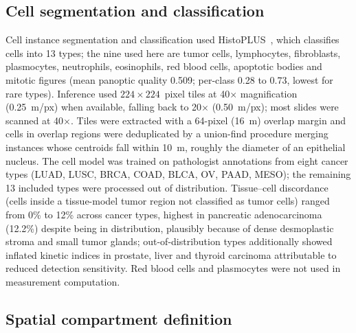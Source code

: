 \subsection{Cell segmentation and classification}
\label{sec:methods:cells}

Cell instance segmentation and classification used
HistoPLUS~\cite{adjadj2026histoplus}, which classifies cells into 13 types; the
nine used here are
tumor cells, lymphocytes, fibroblasts, plasmocytes, neutrophils, eosinophils,
red blood cells, apoptotic bodies and mitotic figures (mean panoptic quality
0.509; per-class 0.28 to 0.73, lowest for rare types). Inference used
$224 \times 224$~pixel tiles at 40$\times$ magnification (0.25~\textmu m/px) when
available, falling back to 20$\times$ (0.50~\textmu m/px); most slides were
scanned at 40$\times$. Tiles were extracted with a 64-pixel (16~\textmu m)
overlap margin and cells in overlap regions were deduplicated by a union-find
procedure merging instances whose centroids fall within 10~\textmu m, roughly the
diameter of an epithelial nucleus. The cell model was trained on pathologist
annotations from eight cancer types (LUAD, LUSC, BRCA, COAD, BLCA, OV, PAAD,
MESO); the remaining 13 included types were processed out of distribution.
Tissue--cell discordance (cells inside a tissue-model tumor region not classified
as tumor cells) ranged from 0\% to 12\% across cancer types, highest in
pancreatic adenocarcinoma (12.2\%) despite being in distribution, plausibly
because of dense desmoplastic stroma and small tumor glands; out-of-distribution
types additionally showed inflated kinetic indices in prostate, liver and thyroid
carcinoma attributable to reduced detection sensitivity. Red blood cells and
plasmocytes were not used in measurement computation.

\subsection{Spatial compartment definition}
\label{sec:methods:spatial}

